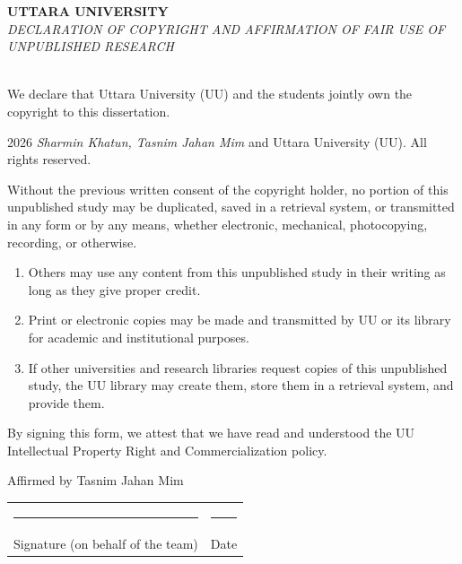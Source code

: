\begin{center}
\begin{tcolorbox}[colback=white, colframe=black, boxrule=1pt, width=\textwidth, arc=5pt, auto outer arc, sharp corners=south]
\centering
\Large\textbf{UTTARA UNIVERSITY} \\[1.5em]
\large\textit{DECLARATION OF COPYRIGHT AND AFFIRMATION OF FAIR USE OF UNPUBLISHED RESEARCH} \\[1em]
\normalsize{\MakeUppercase{\reporttitle}} \\[1.5em]

\begin{justify}
We declare that Uttara University (UU) and the students jointly own the copyright to this dissertation.
\end{justify}

\textcopyright{} 2026 \textit{Sharmin Khatun, Tasnim Jahan Mim} and Uttara University (UU). All rights reserved.\\[1em]

\begin{justify}
Without the previous written consent of the copyright holder, no portion of this unpublished study may be duplicated, saved in a retrieval system, or transmitted in any form or by any means, whether electronic, mechanical, photocopying, recording, or otherwise.
\end{justify}

\begin{enumerate}
  \item Others may use any content from this unpublished study in their writing as long as they give proper credit.
  \item Print or electronic copies may be made and transmitted by UU or its library for academic and institutional purposes.
  \item If other universities and research libraries request copies of this unpublished study, the UU library may create them, store them in a retrieval system, and provide them.
\end{enumerate}

\begin{justify}
By signing this form, we attest that we have read and understood the UU Intellectual Property Right and Commercialization policy.
\end{justify}

\vspace{1em}
Affirmed by Tasnim Jahan Mim \\[2em]
\hfill\begin{tabular}{ll}
\rule{6cm}{0.4pt} & \rule{3cm}{0.4pt} \\
Signature (on behalf of the team) & Date
\end{tabular}
\end{tcolorbox}
\end{center}
